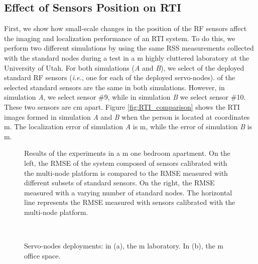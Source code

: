 \documentclass[conference]{IEEEtran}
\begin{document}
\subsection{Effect of Sensors Position on RTI}
\label{sec:fade_level_effect}

First, we show how small-scale changes in the position of the RF sensors affect the imaging and localization performance of an RTI system. To do this, we perform two different simulations by using the same RSS measurements collected with the standard nodes during a test in a  m highly cluttered laboratory at the University of Utah. For both simulations (\emph{A} and \emph{B}), we select  of the  deployed standard RF sensors (\emph{i.e.}, one for each of the  deployed servo-nodes).  of the selected  standard sensors are the same in both simulations. However, in simulation \emph{A}, we select sensor \#9, while in simulation \emph{B} we select sensor \#10. These two sensors are  cm apart. Figure \ref{fig:RTI_comparison} shows the RTI images formed in simulation \emph{A} and \emph{B} when the person is located at coordinates  m. The localization error of simulation \emph{A} is  m, while the error of simulation \emph{B} is  m.



\begin{figure}[t]
    \begin{center}
        \caption{Results of the experiments in a  m one bedroom apartment. On the left, the RMSE of the system composed of  sensors calibrated with the multi-node platform is compared to the RMSE measured with different subsets of  standard sensors. On the right, the RMSE measured with a varying number of standard nodes. The horizontal line represents the RMSE measured with  sensors calibrated with the multi-node platform.}
        \label{fig:apt_218_RMSE_results}
    \end{center}
\end{figure}

\begin{figure*}[t]
    \begin{center}
        \mbox{
             \quad
        }
        \caption{Servo-nodes deployments: in (a), the  m laboratory. In (b), the  m office space.}
        \label{fig:deployment_environments}
    \end{center}
\end{figure*}
\end{document}
